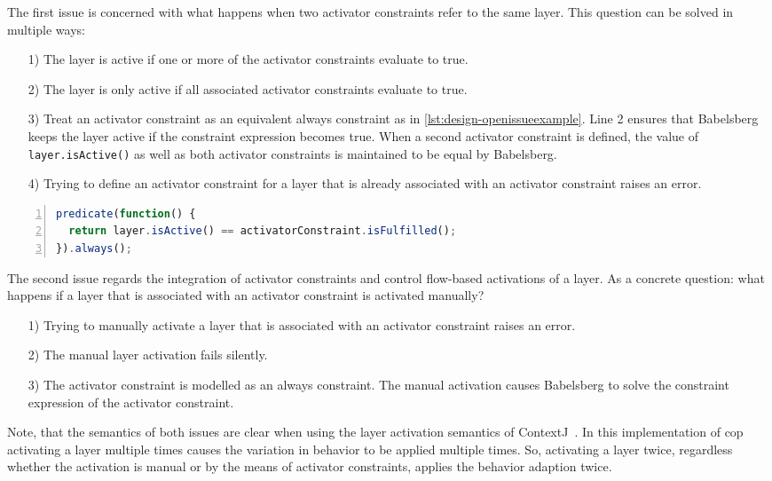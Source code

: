 The first issue is concerned with what happens when two activator constraints refer to the same layer. This question can be solved in multiple ways:
\begin{itemize}
\item[1) ] The layer is active if one or more of the activator constraints evaluate to true.
\item[2) ] The layer is only active if all associated activator constraints evaluate to true.
\item[3) ] Treat an activator constraint as an equivalent always constraint as in \autoref{lst:design-openissueexample}. Line 2 ensures that Babelsberg keeps the layer active if the constraint expression becomes true. When a second activator constraint is defined, the value of \texttt{layer.isActive()} as well as both activator constraints is maintained to be equal by Babelsberg.
\item[4) ] Trying to define an activator constraint for a layer that is already associated with an activator constraint raises an error.
\end{itemize}
%
\begin{lstlisting}[label=lst:design-openissueexample,caption={An activator constraint modelled as an always constraint},float,numbers=left,language=JavaScript,morekeywords={always}]
predicate(function() {
  return layer.isActive() == activatorConstraint.isFulfilled();
}).always();
\end{lstlisting}
%
The second issue regards the integration of activator constraints and control flow-based activations of a layer. As a concrete question: what happens if a layer that is associated with an activator constraint is activated manually?
\begin{itemize}
\item[1) ] Trying to manually activate a layer that is associated with an activator constraint raises an error.
\item[2) ] The manual layer activation fails silently.
\item[3) ] The activator constraint is modelled as an always constraint. The manual activation causes Babelsberg to solve the constraint expression of the activator constraint.
\end{itemize}
%
Note, that the semantics of both issues are clear when using the layer activation semantics of ContextJ~\cite{appeltauer:2011:contextj}. In this implementation of \gls{cop} activating a layer multiple times causes the variation in behavior to be applied multiple times.
So, activating a layer twice, regardless whether the activation is manual or by the means of activator constraints, applies the behavior adaption twice.

